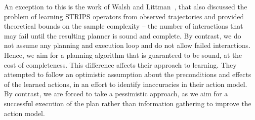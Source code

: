 \documentclass{article}
\begin{document}
	
	
	
	An exception to this is the work of Walsh and Littman~, that also discussed the problem of learning STRIPS operators from observed trajectories and provided theoretical bounds on the sample complexity -- the number of interactions that may fail until the resulting planner is  sound and complete.  By contrast, we do not assume any planning and execution loop and do not allow failed interactions. Hence, we aim for a planning algorithm that is guaranteed to be sound, at the cost of completeness. This difference affects their approach to learning. They attempted to follow an optimistic assumption about the preconditions and effects of the learned actions, in an effort to identify inaccuracies in their action model. By contrast, we are forced to take a pessimistic approach, as we aim for a successful execution of the plan rather than information gathering to improve the action model. 
	
\end{document}
